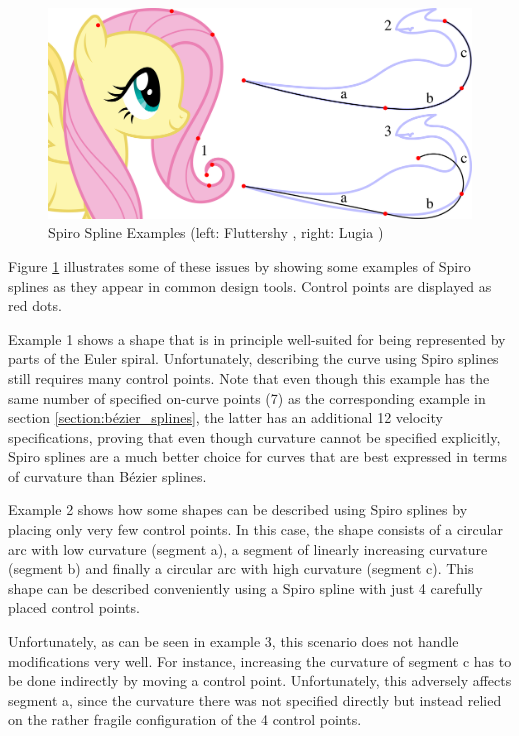 \documentclass[a4paper]{article}
\begin{document}
				\begin{figure}[htbp]
					\centering
					\includegraphics[width=\textwidth]{content/output/examples_spiro.pdf}
					\caption{Spiro Spline Examples (left: Fluttershy \cite{fluttershy}, right: Lugia \cite{lugia})}
					\label{figure:examples_spiro}
				\end{figure}

				Figure \ref{figure:examples_spiro} illustrates some of these issues by showing some examples of Spiro splines as they appear in common design tools. Control points are displayed as red dots.

				Example 1 shows a shape that is in principle well-suited for being represented by parts of the Euler spiral. Unfortunately, describing the curve using Spiro splines still requires many control points. Note that even though this example has the same number of specified on-curve points (7) as the corresponding example in section \ref{section:bézier_splines}, the latter has an additional 12 velocity specifications, proving that even though curvature cannot be specified explicitly, Spiro splines are a much better choice for curves that are best expressed in terms of curvature than Bézier splines.

				Example 2 shows how some shapes can be described using Spiro splines by placing only very few control points. In this case, the shape consists of a circular arc with low curvature (segment a), a segment of linearly increasing curvature (segment b) and finally a circular arc with high curvature (segment c). This shape can be described conveniently using a Spiro spline with just 4 carefully placed control points.

				Unfortunately, as can be seen in example 3, this scenario does not handle modifications very well. For instance, increasing the curvature of segment c has to be done indirectly by moving a control point. Unfortunately, this adversely affects segment a, since the curvature there was not specified directly but instead relied on the rather fragile configuration of the 4 control points.
\end{document}
